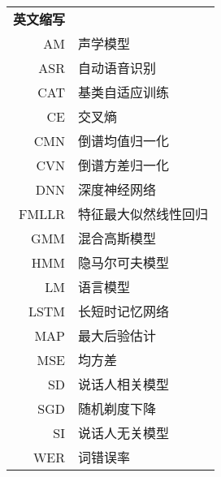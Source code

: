 \begin{longtable}{rl}
\textbf{英文缩写} \\
AM & 声学模型 \\
ASR & 自动语音识别 \\
CAT & 基类自适应训练 \\
CE & 交叉熵 \\
CMN & 倒谱均值归一化 \\
CVN & 倒谱方差归一化 \\
DNN & 深度神经网络 \\
FMLLR & 特征最大似然线性回归 \\
GMM & 混合高斯模型 \\
HMM & 隐马尔可夫模型 \\
LM & 语言模型 \\
LSTM & 长短时记忆网络 \\
MAP & 最大后验估计 \\
MSE & 均方差 \\
SD & 说话人相关模型 \\
SGD & 随机剃度下降 \\
SI & 说话人无关模型 \\
WER & 词错误率 \\
\end{longtable}
